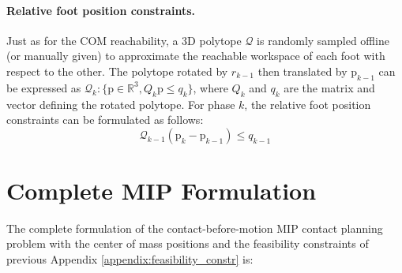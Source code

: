 \paragraph{Relative foot position constraints.\label{appendix:foot_pos_constr}}
Just as for the COM reachability, a 3D polytope $\mathcal{Q}$ is randomly sampled offline (or manually given) to approximate the reachable workspace of each foot with respect to the other. The polytope rotated by $r_{k-1}$ then translated by $\mbox{p}_{k-1}$ can be expressed as $\mathcal{Q}_k: \{ \mbox{p} \in \mathbb{R}^3, Q_k \mbox{p} \leq q_k \}$, where $Q_k$ and $q_k$ are the matrix and vector defining the rotated polytope.
For phase $k$, the relative foot position constraints can be formulated as follows:
\begin{equation}
    \mathcal{Q}_{k-1} (\mbox{p}_k - \mbox{p}_{k-1}) \leq q_{k-1}
\end{equation}

\section{Complete MIP Formulation \label{appendix:complete_mip_formulation}}
The complete formulation of the contact-before-motion MIP contact planning problem with the center of mass positions and the feasibility constraints of previous Appendix \ref{appendix:feasibility_constr} is:

